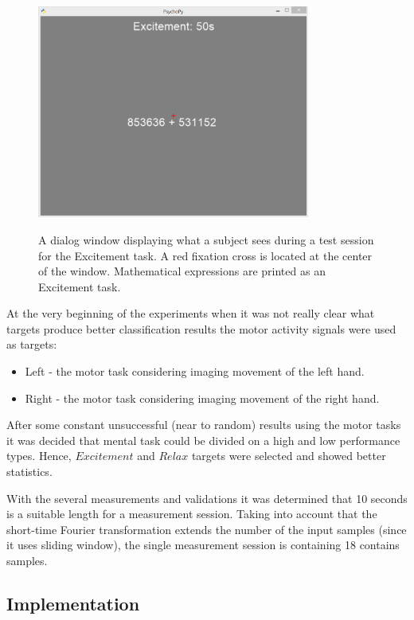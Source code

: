 \documentclass[12pt]{article}
\theoremstyle{definition}
\begin{document}
\begin{figure} [H]
\begin{center}
\label{fig:fnCompModel}
\includegraphics[width=0.8\textwidth]{test_ui}
\caption{A dialog window displaying what a subject sees during a test session for the Excitement task. A red fixation cross is located at the center of the window. Mathematical expressions are printed as an Excitement task.}
\end{center}
\end{figure}

At the very beginning of the experiments when it was not really clear what targets produce better classification results the motor activity signals were used as targets:
\begin{itemize}
\item Left - the motor task considering imaging movement of the left hand.
\item Right - the motor task considering imaging movement of the right hand.
\end{itemize}
After some constant unsuccessful (near to random) results using the motor tasks it was decided that mental task could be divided on a high and low performance types. Hence, $Excitement$ and $Relax$ targets were selected and showed better statistics.

With the several measurements and validations it was determined that 10 seconds is a suitable length for a measurement session. Taking into account that the short-time Fourier transformation extends the number of the input samples (since it uses sliding window), the single measurement session is containing 18 contains samples.

\subsection{Implementation}
\end{document}

